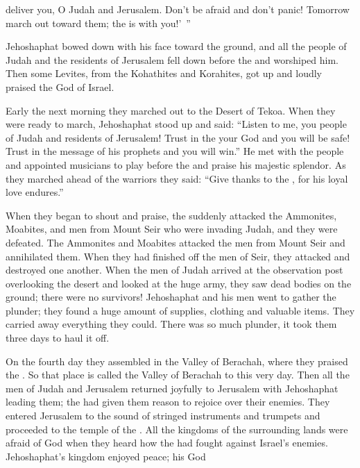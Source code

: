 {{}
deliver
you, O Judah
and Jerusalem.
Don’t
be afraid
and don’t
panic! Tomorrow
march out
toward
them; the
{}
is with you!’ ”
\par }{\PP {}Jehoshaphat
bowed
down with his face
toward the ground,
and all
the people of Judah
and the residents
of Jerusalem
fell
down before
the {}
and worshiped him.
Then
some
Levites,
from
the Kohathites
and Korahites,
got up and loudly
praised
the {}
God
of Israel.
\par }{\PP {}Early
the next morning
they marched
out to the Desert
of Tekoa.
When they were ready to march,
Jehoshaphat
stood up
and said: “Listen
to me, you people of Judah
and residents
of Jerusalem! Trust
in the
{}
your God
and you will be safe! Trust
in the message of his prophets
and you will win.”
He met with
the people
and appointed
musicians
to play before
the {}
and praise
his majestic
splendor. As they marched
ahead
of the warriors
they said: “Give thanks
to the
{}, for
his loyal love
endures.”
\par }{\PP {}When
they began
to shout
and praise,
the {}
suddenly attacked
the Ammonites,
Moabites,
and men from Mount
Seir
who were invading
Judah,
and they were defeated.
The Ammonites
and Moabites
attacked
the men
from Mount
Seir
and annihilated
them. When they had finished off
the men
of Seir,
they attacked
and destroyed
one
another.
When the men of Judah
arrived
at
the observation post
overlooking
the desert
and looked
at
the huge
army, they saw dead bodies
on the ground;
there were no
survivors!
Jehoshaphat
and his men
went
to gather
the
plunder;
they found
a huge amount
of supplies,
clothing
and valuable
items.
They carried away
everything they could.
There was so
much plunder,
it took them
three
days
to haul
it off.
\par }{\PP {}On the fourth
day
they assembled
in the Valley
of Berachah,
where
they praised
the {}. So that
place
is called
the Valley
of Berachah
to
this very day.
Then all
the men
of Judah
and Jerusalem
returned
joyfully
to
Jerusalem
with Jehoshaphat
leading
them; the
{}
had given them reason to rejoice
over their enemies.
They entered
Jerusalem
to the sound of stringed instruments
and trumpets
and proceeded to
the temple
of the {}.
All
the kingdoms
of the surrounding lands
were afraid
of God
when they heard
how the
{}
had
fought
against
Israel’s
enemies.
Jehoshaphat’s
kingdom
enjoyed
peace;
his God
}
